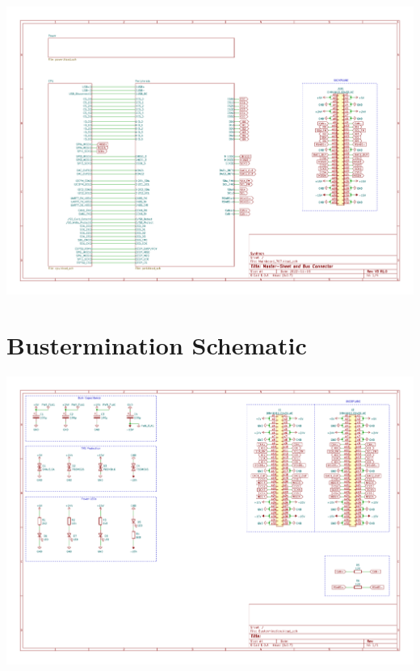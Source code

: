 \documentclass[11pt, a4paper, listof=numbered, captions=tableheading, headinclude, table, xcdraw]{scrreprt}
\begin{document}
\includegraphics[page=4,angle=90,width=\textwidth]{schematics/Mainboard_767.pdf}

\chapter{Bustermination Schematic}
\includegraphics[page=1,angle=90,width=\textwidth]{schematics/Bustermination.pdf}
\end{document}
